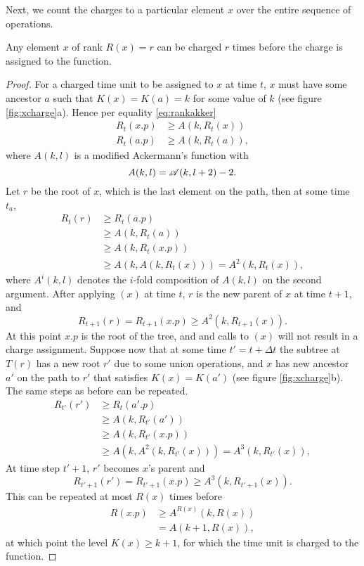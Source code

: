 Next, we count the charges to a particular element $x$ over the entire sequence of operations. 
\begin{lemma}\label{lem:xcharge}
  Any element $x$ of rank $R(x) = r$ can be charged $r$ times before the charge is assigned to the  function.
\end{lemma}
\begin{proof}
  For a charged time unit to be assigned to $x$ at time $t$, $x$ must have some ancestor $a$ such that $K(x) = K(a) = k$ for some value of $k$ (see figure \ref{fig:xcharge}a). Hence per equality \ref{eq:rankakker}
  \begin{align*}
    R_{t}(x.p) & \geq A(k,R_{t}(x))\\
    R_{t}(a.p) & \geq A(k,R_{t}(a)),
  \end{align*}
  where $A(k,l)$ is a modified Ackermann's function with 
  \begin{equation*}
    A(k,l) = \mathscr{A}(k,l+2)-2.
  \end{equation*}
  Let $r$ be the root of $x$, which is the last element on the path, then at some time $t_a$,
  \begin{align*}
    R_{t}(r) &\geq R_{t}(a.p) \\
    &\geq A(k,R_{t}(a)) \\
    &\geq A(k,R_{t}(x.p)) \\
    &\geq A(k, A(k, R_{t}(x))) = A^2(k, R_{t}(x)),
  \end{align*}
  where $A^i(k,l)$ denotes the $i$-fold composition of $A(k,l)$ on the second argument. After applying $(x)$ at time $t$, $r$ is the new parent of $x$ at time $t+1$, and 
  \begin{equation*}
    R_{t+1}(r) = R_{t+1}(x.p) \geq A^2(k, R_{t+1}(x)).
  \end{equation*}
  At this point $x.p$ is the root of the tree, and and calls to $(x)$ will not result in a charge assignment. Suppose now that at some time $t' = t + \Delta t$ the subtree at $T(r)$ has a new root $r'$ due to some union operations, and $x$ has new ancestor $a'$ on the path to $r'$ that satisfies $K(x) = K(a')$ (see figure \ref{fig:xcharge}b). The same steps as before can be repeated. 
  \begin{align*}
    R_{t'}(r') &\geq R_{t}(a'.p) \\
    &\geq A(k,R_{t'}(a')) \\
    &\geq A(k,R_{t'}(x.p)) \\
    &\geq A(k, A^2(k, R_{t'}(x))) = A^3(k, R_{t'}(x)),
  \end{align*}
  At time step $t'+1$, $r'$ becomes $x$'s parent and
  \begin{equation*}
    R_{t'+1}(r') = R_{t'+1}(x.p) \geq A^3(k, R_{t'+1}(x)).
  \end{equation*}
  This can be repeated at most $R(x)$ times before
  \begin{align*}
    R(x.p) &\geq A^{R(x)}(k,R(x)) \\
    &= A(k+1, R(x)),
  \end{align*}
  at which point the level $K(x)\geq k+1$, for which the time unit is charged to the  function. 
\end{proof}

